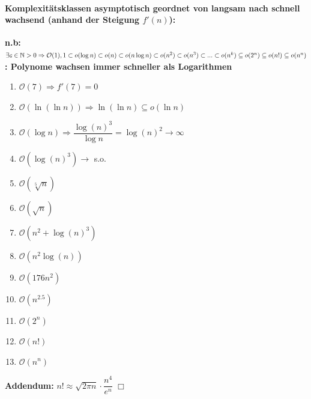 \documentclass[a4paper,12pt]{article}
\begin{document}
	\paragraph{Komplexitätsklassen asymptotisch geordnet von langsam nach schnell wachsend (anhand der Steigung $f'(n)$):\\}
	\textbf{n.b: $\exists c \in \mathbb{N} > 0 \Rightarrow \mathcal{O}(1), 1 \subset o(\log n) \subset o(n) \subset o(n \log n) \subset o(n^2) \\\subset o(n^3) \subset ...  \subset o(n^k) \subseteq o(2^n) \subseteq o(n!) \subseteq o(n^n)$ : Polynome wachsen immer schneller als Logarithmen}
	\begin{enumerate}
		\item $\mathcal{O}(7) \Rightarrow f'(7) = 0$
		\item $\mathcal{O}(\ln{(\ln n)}) \Rightarrow \ln{(\ln n)} \subseteq o(\ln n)$
		\item $\mathcal{O}(\log n) \Rightarrow \dfrac{\log{(n)}^3}{\log n} = \log{(n)}^2 \rightarrow \infty$
		\item $\mathcal{O}(\log{(n)}^3) \rightarrow$ s.o.
		\item $\mathcal{O}(\sqrt[5]{n})$
		\item $\mathcal{O}(\sqrt{n})$
		\item $\mathcal{O}(n^2 + \log{(n)}^3)$
		\item $\mathcal{O}(n^2\log{(n)})$
		\item $\mathcal{O}(176n^2)$
		\item $\mathcal{O}(n^{2.5})$
		\item $\mathcal{O}(2^n)$
		\item $\mathcal{O}(n!)$
		\item $\mathcal{O}(n^n)$
	\end{enumerate}
	
	\textbf{Addendum:} $n! \approx \sqrt{2\pi n}\cdot \dfrac{n^4}{e^n} \;\Box$
\end{document}
